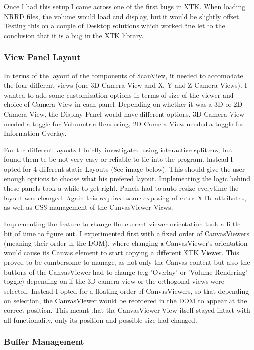 \documentclass[a4paper,11pt,twoside]{article}
\begin{document}
Once I had this setup I came across one of the first bugs in XTK. When loading NRRD files, the volume would load and display, but it would be slightly offset. Testing this on a couple of Desktop solutions which worked fine let to the conclusion that it is a bug in the XTK library. 


\subsubsection{View Panel Layout}

In terms of the layout of the components of ScanView, it needed to accomodate the four different views (one 3D Camera View and X, Y and Z Camera Views). I wanted to add some customisation options in terms of size of the viewer and choice of Camera View in each panel. Depending on whether it was a 3D or 2D Camera View, the Display Panel would have different options. 3D Camera View needed a toggle for Volumetric Rendering, 2D Camera View needed a toggle for Information Overlay.

For the different layouts I briefly investigated using interactive splitters, but found them to be not very easy or reliable to tie into the program. Instead I opted for 4 different static Layouts (See image below). This should give the user enough options to choose what his prefered layout. Implementing the logic behind these panels took a while to get right. Panels had to auto-resize everytime the layout was changed. Again this required some exposing of extra XTK attributes, as well as CSS management of the CanvasViewer Views.

Implementing the feature to change the current viewer orientation took a little bit of time to figure out. I experimented first with a fixed order of CanvasViewers (meaning their order in the DOM), where changing a CanvasViewer's orientation would cause its Canvas element to start copying a different XTK Viewer. This proved to be cumbersome to manage, as not only the Canvas content but also the buttons of the CanvasViewer had to change (e.g 'Overlay' or 'Volume Rendering' toggle) depending on if the 3D camera view or the orthogonal views were selected. Instead I opted for a floating order of CanvasViewers, so that depending on selection, the CanvasViewer would be reordered in the DOM to appear at the correct position. This meant that the CanvasViewer View itself stayed intact with all functionality, only its position and possible size had changed.


\subsubsection{Buffer Management}
\end{document}

